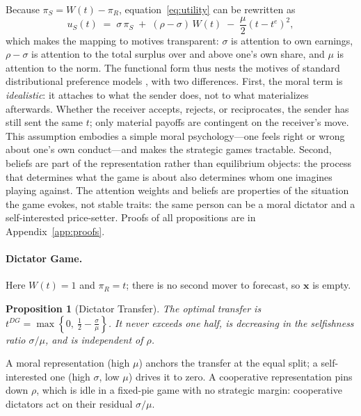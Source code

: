 \documentclass[11pt]{article}
\theoremstyle{plain}
\newtheorem{proposition}{Proposition}
\theoremstyle{remark}
\begin{document}
Because $\pi_S=W(t)-\pi_R$, equation~\eqref{eq:utility} can be rewritten as
\begin{equation}
u_S(t) \;=\; \sigma\,\pi_S \;+\; (\rho-\sigma)\,W(t)\;-\;\frac{\mu}{2}\left(t-t^{e}\right)^{2},
\label{eq:utility_rewritten}
\end{equation}
which makes the mapping to motives transparent: $\sigma$ is attention to own earnings, $\rho-\sigma$ is attention to the total surplus over and above one's own share, and $\mu$ is attention to the norm. The functional form thus nests the motives of standard distributional preference models \citep{FehrSchmidt1999, BoltonOckenfels2000, CharnessRabin2002}, with two differences. First, the moral term is \emph{idealistic}: it attaches to what the sender does, not to what materializes afterwards. Whether the receiver accepts, rejects, or reciprocates, the sender has still sent the same $t$; only material payoffs are contingent on the receiver's move. This assumption embodies a simple moral psychology---one feels right or wrong about one's own conduct---and makes the strategic games tractable. Second, beliefs are part of the representation rather than equilibrium objects: the process that determines what the game is about also determines whom one imagines playing against. The attention weights and beliefs are properties of the situation the game evokes, not stable traits: the same person can be a moral dictator and a self-interested price-setter. Proofs of all propositions are in Appendix~\ref{app:proofs}.

\paragraph{Dictator Game.} Here $W(t)=1$ and $\pi_R=t$; there is no second mover to forecast, so $\mathbf{x}$ is empty.

\begin{proposition}[Dictator Transfer]
\label{prop:dg}
The optimal transfer is $t^{DG}=\max\left\{0,\ \tfrac12-\tfrac{\sigma}{\mu}\right\}$. It never exceeds one half, is decreasing in the selfishness ratio $\sigma/\mu$, and is independent of $\rho$.
\end{proposition}

A moral representation (high $\mu$) anchors the transfer at the equal split; a self-interested one (high $\sigma$, low $\mu$) drives it to zero. A cooperative representation pins down $\rho$, which is idle in a fixed-pie game with no strategic margin: cooperative dictators act on their residual $\sigma/\mu$.
\end{document}

